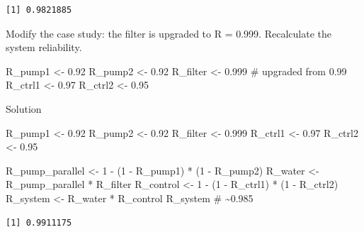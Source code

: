 \documentclass[
  letterpaper,
  DIV=11,
  numbers=noendperiod]{scrreprt}
\newenvironment{Shaded}{\begin{snugshade}}{\end{snugshade}}
\newcommand{\CommentTok}[1]{\textcolor[rgb]{0.37,0.37,0.37}{#1}}
\newcommand{\DecValTok}[1]{\textcolor[rgb]{0.68,0.00,0.00}{#1}}
\newcommand{\FloatTok}[1]{\textcolor[rgb]{0.68,0.00,0.00}{#1}}
\newcommand{\NormalTok}[1]{\textcolor[rgb]{0.00,0.23,0.31}{#1}}
\newcommand{\OtherTok}[1]{\textcolor[rgb]{0.00,0.23,0.31}{#1}}
\newcommand{\SpecialCharTok}[1]{\textcolor[rgb]{0.37,0.37,0.37}{#1}}
\begin{document}
\begin{verbatim}
[1] 0.9821885
\end{verbatim}

\begin{tcolorbox}[enhanced jigsaw, arc=.35mm, bottomrule=.15mm, bottomtitle=1mm, breakable, colback=white, colbacktitle=quarto-callout-note-color!10!white, colframe=quarto-callout-note-color-frame, coltitle=black, left=2mm, leftrule=.75mm, opacityback=0, opacitybacktitle=0.6, rightrule=.15mm, title=\textcolor{quarto-callout-note-color}{\faInfo}\hspace{0.5em}{Try It}, titlerule=0mm, toprule=.15mm, toptitle=1mm]

Modify the case study: the filter is upgraded to R = 0.999. Recalculate
the system reliability.

\begin{Shaded}
\begin{Highlighting}[]
\NormalTok{R\_pump1  }\OtherTok{\textless{}{-}} \FloatTok{0.92}
\NormalTok{R\_pump2  }\OtherTok{\textless{}{-}} \FloatTok{0.92}
\NormalTok{R\_filter }\OtherTok{\textless{}{-}} \FloatTok{0.999}   \CommentTok{\# upgraded from 0.99}
\NormalTok{R\_ctrl1  }\OtherTok{\textless{}{-}} \FloatTok{0.97}
\NormalTok{R\_ctrl2  }\OtherTok{\textless{}{-}} \FloatTok{0.95}
\end{Highlighting}
\end{Shaded}

Solution

\begin{Shaded}
\begin{Highlighting}[]
\NormalTok{R\_pump1  }\OtherTok{\textless{}{-}} \FloatTok{0.92}
\NormalTok{R\_pump2  }\OtherTok{\textless{}{-}} \FloatTok{0.92}
\NormalTok{R\_filter }\OtherTok{\textless{}{-}} \FloatTok{0.999}
\NormalTok{R\_ctrl1  }\OtherTok{\textless{}{-}} \FloatTok{0.97}
\NormalTok{R\_ctrl2  }\OtherTok{\textless{}{-}} \FloatTok{0.95}

\NormalTok{R\_pump\_parallel }\OtherTok{\textless{}{-}} \DecValTok{1} \SpecialCharTok{{-}}\NormalTok{ (}\DecValTok{1} \SpecialCharTok{{-}}\NormalTok{ R\_pump1) }\SpecialCharTok{*}\NormalTok{ (}\DecValTok{1} \SpecialCharTok{{-}}\NormalTok{ R\_pump2)}
\NormalTok{R\_water   }\OtherTok{\textless{}{-}}\NormalTok{ R\_pump\_parallel }\SpecialCharTok{*}\NormalTok{ R\_filter}
\NormalTok{R\_control }\OtherTok{\textless{}{-}} \DecValTok{1} \SpecialCharTok{{-}}\NormalTok{ (}\DecValTok{1} \SpecialCharTok{{-}}\NormalTok{ R\_ctrl1) }\SpecialCharTok{*}\NormalTok{ (}\DecValTok{1} \SpecialCharTok{{-}}\NormalTok{ R\_ctrl2)}
\NormalTok{R\_system  }\OtherTok{\textless{}{-}}\NormalTok{ R\_water }\SpecialCharTok{*}\NormalTok{ R\_control}
\NormalTok{R\_system  }\CommentTok{\# \textasciitilde{}0.985}
\end{Highlighting}
\end{Shaded}

\begin{verbatim}
[1] 0.9911175
\end{verbatim}

\end{tcolorbox}
\end{document}
